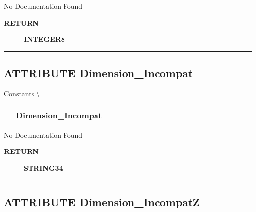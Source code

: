 \par





No Documentation Found








\par
\begin{description}
\item [\colorbox{tagtype}{\color{white} \textbf{\textsf{RETURN}}}] \textbf{INTEGER8} --- 
\end{description}




\rule{\linewidth}{0.5pt}
\subsection*{\textsf{\colorbox{headtoc}{\color{white} ATTRIBUTE}
Dimension\_Incompat}}

\hypertarget{ecldoc:pbblas.constants.dimension_incompat}{}
\hspace{0pt} \hyperlink{ecldoc:PBblas.Constants}{Constants} \textbackslash 

{\renewcommand{\arraystretch}{1.5}
\begin{tabularx}{\textwidth}{|>{\raggedright\arraybackslash}l|X|}
\hline
\hspace{0pt}\mytexttt{\color{red} } & \textbf{Dimension\_Incompat} \\
\hline
\end{tabularx}
}

\par





No Documentation Found








\par
\begin{description}
\item [\colorbox{tagtype}{\color{white} \textbf{\textsf{RETURN}}}] \textbf{STRING34} --- 
\end{description}




\rule{\linewidth}{0.5pt}
\subsection*{\textsf{\colorbox{headtoc}{\color{white} ATTRIBUTE}
Dimension\_IncompatZ}}


